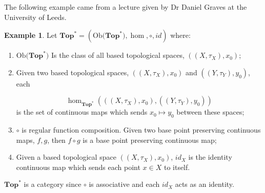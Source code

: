\documentclass[11pt,a4paper]{article}
\theoremstyle{definition}
\newtheorem{example}[thm]{Example}
\newcommand\ho[3][]{\hom_{#1}(#2,#3)}
\newcommand\ob[1]{\mathrm{Ob(}#1\mathrm{)}}
\numberwithin{equation}{section}
\begin{document}
The following example came from a lecture given by Dr Daniel Graves at the University of Leeds.
\begin{example}
    \label{exe:catbasedtop}
    Let $\mathbf{Top}^{*} = (\ob{\mathbf{Top}^{*}},\hom,\circ,id)$ where:
    \begin{enumerate}
        \item $\ob{\mathbf{Top}^{*}}$ Is the class of all based topological spaces, $((X,\tau_X),x_{0})$;
        \item Given two based topological spaces, $((X,\tau_X),x_{0})$ and $((Y,\tau_Y),y_{0})$, each 
        
        \[\ho[\mathbf{Top}^*]{((X,\tau_X),x_{0})}{((Y,\tau_Y),y_{0})}\]
        is the set of continuous maps which sends $x_0\mapsto y_{0}$ between these spaces;
        \item $\circ$ is regular function composition. Given two base point preserving continuous maps, $f,g$, then $f\circ g$ is a base point preserving continuous map;
        \item Given a based topological space $((X,\tau_X),x_{0})$, $id_{X}$ is the identity continuous map which sends each point $x\in X$ to itself.
    \end{enumerate}
    $\mathbf{Top}^*$ is a category since $\circ$ is associative and each $id_{X}$ acts as an identity.
\end{example}
\end{document}
